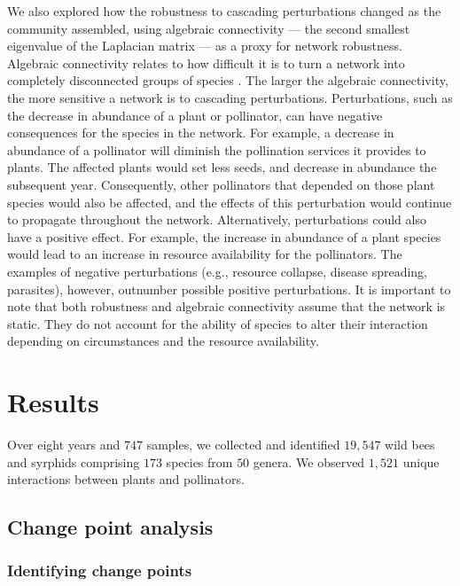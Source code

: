 \documentclass[12pt]{article}
\begin{document}
We also explored how the robustness to cascading perturbations changed
as the community assembled, using algebraic connectivity --- the
second smallest eigenvalue of the Laplacian matrix
\citep{fiedler1973algebraic} --- as a proxy for network robustness.
 Algebraic connectivity relates to how
difficult it is to turn a network into completely disconnected groups
of species \citep{costa2007characterization, gibert2013spatial}. The
larger the algebraic connectivity, the more sensitive a network is to
cascading perturbations. Perturbations, such as the decrease in
abundance of a plant or pollinator, can have negative consequences for
the species in the network. For example, a decrease in abundance of a
pollinator will diminish the pollination services it provides to
plants. The affected plants would set less seeds, and decrease in
abundance the subsequent year. Consequently, other pollinators that
depended on those plant species would also be affected, and the
effects of this perturbation would continue to propagate throughout
the network. Alternatively, perturbations could also have a positive
effect. For example, the increase in abundance of a plant species
would lead to an increase in resource availability for the
pollinators. The examples of negative perturbations (e.g., resource
collapse, disease spreading, parasites), however, outnumber possible
positive perturbations. It is important to note that both robustness
and algebraic connectivity assume that the network is static. They do
not account for the ability of species to alter their interaction
depending on circumstances and the resource availability.

\section*{Results}
\label{sec:results}

Over eight years and $747$ samples, we collected and identified
$19,547$ wild bees and syrphids comprising $173$ species from $50$
genera. We observed $1,521$ unique interactions between plants and
pollinators.

\subsection*{Change point analysis}
\subsubsection*{Identifying change points}
\end{document}

